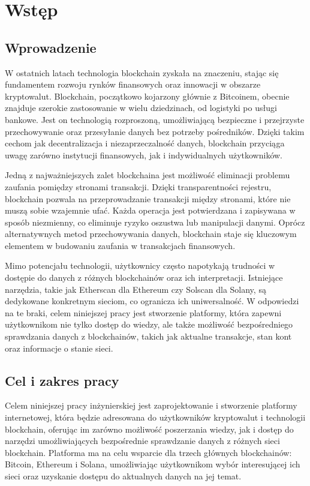 \chapter{Wstęp}

\section{Wprowadzenie}

W ostatnich latach technologia blockchain zyskała na znaczeniu, stając się fundamentem rozwoju rynków finansowych oraz innowacji w obszarze kryptowalut. Blockchain, początkowo kojarzony głównie z Bitcoinem, obecnie znajduje szerokie zastosowanie w wielu dziedzinach, od logistyki po usługi bankowe. Jest on technologią rozproszoną, umożliwiającą bezpieczne i przejrzyste przechowywanie oraz przesyłanie danych bez potrzeby pośredników. Dzięki takim cechom jak decentralizacja i niezaprzeczalność danych, blockchain przyciąga uwagę zarówno instytucji finansowych, jak i indywidualnych użytkowników.

Jedną z najważniejszych zalet blockchaina jest możliwość eliminacji problemu zaufania pomiędzy stronami transakcji. Dzięki transparentności rejestru, blockchain pozwala na przeprowadzanie transakcji między stronami, które nie muszą sobie wzajemnie ufać. Każda operacja jest potwierdzana i zapisywana w sposób niezmienny, co eliminuje ryzyko oszustwa lub manipulacji danymi. Oprócz alternatywnych metod przechowywania danych, blockchain staje się kluczowym elementem w budowaniu zaufania w transakcjach finansowych.

Mimo potencjału technologii, użytkownicy często napotykają trudności w dostępie do danych z różnych blockchainów oraz ich interpretacji. Istniejące narzędzia, takie jak Etherscan dla Ethereum czy Solscan dla Solany, są dedykowane konkretnym sieciom, co ogranicza ich uniwersalność. W odpowiedzi na te braki, celem niniejszej pracy jest stworzenie platformy, która zapewni użytkownikom nie tylko dostęp do wiedzy, ale także możliwość bezpośredniego sprawdzania danych z blockchainów, takich jak aktualne transakcje, stan kont oraz informacje o stanie sieci.

\section{Cel i zakres pracy}

Celem niniejszej pracy inżynierskiej jest zaprojektowanie i stworzenie platformy internetowej, która będzie adresowana do użytkowników kryptowalut i technologii blockchain, oferując im zarówno możliwość poszerzania wiedzy, jak i dostęp do narzędzi umożliwiających bezpośrednie sprawdzanie danych z różnych sieci blockchain. Platforma ma na celu wsparcie dla trzech głównych blockchainów: Bitcoin, Ethereum i Solana, umożliwiając użytkownikom wybór interesującej ich sieci oraz uzyskanie dostępu do aktualnych danych na jej temat.

